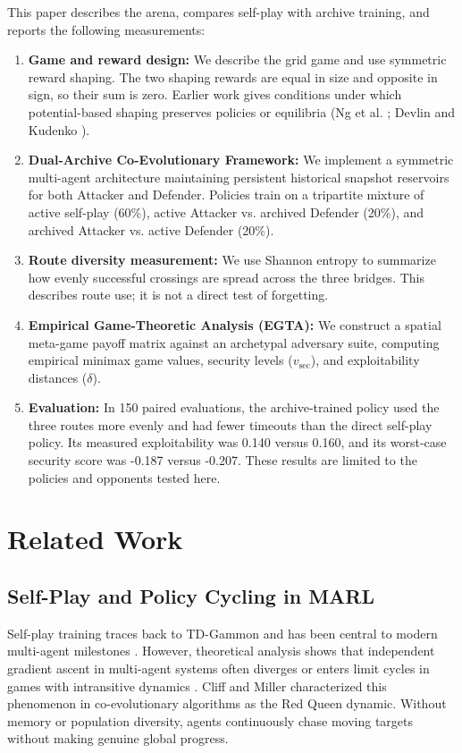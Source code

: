 \documentclass[conference]{IEEEtran}
\begin{document}
This paper describes the arena, compares self-play with archive training, and reports the following measurements:
\begin{enumerate}
    \item \textbf{Game and reward design:} We describe the grid game and use symmetric reward shaping. The two shaping rewards are equal in size and opposite in sign, so their sum is zero. Earlier work gives conditions under which potential-based shaping preserves policies or equilibria (Ng et al. \cite{ng1999policy}; Devlin and Kudenko \cite{devlin2011theoretical}).
    \item \textbf{Dual-Archive Co-Evolutionary Framework:} We implement a symmetric multi-agent architecture maintaining persistent historical snapshot reservoirs for both Attacker and Defender. Policies train on a tripartite mixture of active self-play (60\%), active Attacker vs. archived Defender (20\%), and archived Attacker vs. active Defender (20\%).
    \item \textbf{Route diversity measurement:} We use Shannon entropy to summarize how evenly successful crossings are spread across the three bridges. This describes route use; it is not a direct test of forgetting.
    \item \textbf{Empirical Game-Theoretic Analysis (EGTA):} We construct a spatial meta-game payoff matrix against an archetypal adversary suite, computing empirical minimax game values, security levels ($v_{\text{sec}}$), and exploitability distances ($\delta$).
    \item \textbf{Evaluation:} In 150 paired evaluations, the archive-trained policy used the three routes more evenly and had fewer timeouts than the direct self-play policy. Its measured exploitability was 0.140 versus 0.160, and its worst-case security score was -0.187 versus -0.207. These results are limited to the policies and opponents tested here.
\end{enumerate}

\section{Related Work}

\subsection{Self-Play and Policy Cycling in MARL}
Self-play training traces back to TD-Gammon \cite{tesauro1995temporal} and has been central to modern multi-agent milestones \cite{silver2016mastering, vinyals2019alphastar, berner2019dota}. However, theoretical analysis shows that independent gradient ascent in multi-agent systems often diverges or enters limit cycles in games with intransitive dynamics \cite{balduzzi2019open}. Cliff and Miller \cite{cliff1995tracking} characterized this phenomenon in co-evolutionary algorithms as the Red Queen dynamic. Without memory or population diversity, agents continuously chase moving targets without making genuine global progress.
\end{document}

